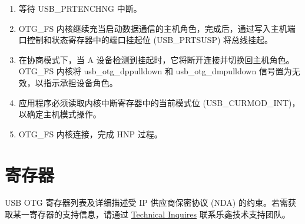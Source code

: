 \documentclass[main\_\_CN.tex]{subfiles}
\begin{document}
\begin{enumerate}
    \item 等待 USB\_PRTENCHNG 中断。

    \item OTG\_FS 内核继续充当启动数据通信的主机角色，完成后，通过写入主机端口控制和状态寄存器中的端口挂起位 (USB\_PRTSUSP) 将总线挂起。

    \item 在协商模式下，当 A 设备检测到挂起时，它将断开连接并切换回主机角色。OTG\_FS 内核将 usb\_otg\_dppulldown 和 usb\_otg\_dmpulldown 信号置为无效，以指示承担设备角色。

    \item 应用程序必须读取内核中断寄存器中的当前模式位 (USB\_CURMOD\_INT)，以确定主机模式操作。

    \item OTG\_FS 内核连接，完成 HNP 过程。
\end{enumerate}















\section{寄存器}

USB OTG 寄存器列表及详细描述受 IP 供应商保密协议 (NDA) 的约束。若需获取某一寄存器的支持信息，请通过 \href{https://www.espressif.com/zh-hans/contact-us/technical-inquiries}{Technical Inquires} 联系乐鑫技术支持团队。
\end{document}
